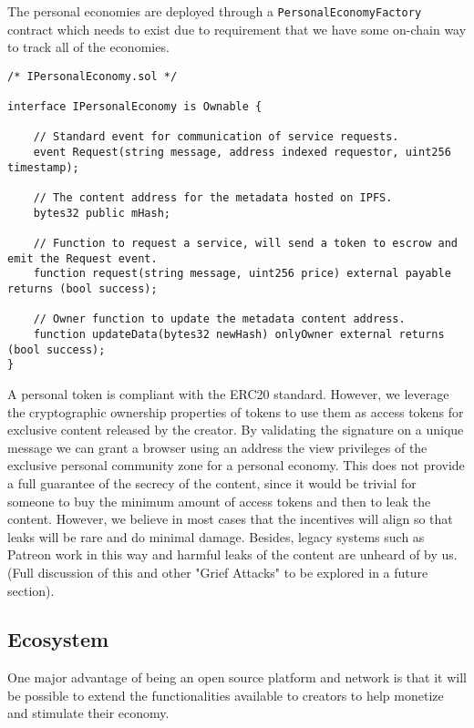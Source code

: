 \documentclass[a4paper, 10pt]{article}
\begin{document}
The personal economies are deployed through a \texttt{PersonalEconomyFactory} contract which needs to exist due to requirement that we have some on-chain way to track all of the economies.

\vfill

\begin{lstlisting}
/* IPersonalEconomy.sol */

interface IPersonalEconomy is Ownable {

	// Standard event for communication of service requests.
	event Request(string message, address indexed requestor, uint256 timestamp);
    
    // The content address for the metadata hosted on IPFS.
    bytes32 public mHash;
    
    // Function to request a service, will send a token to escrow and emit the Request event.
    function request(string message, uint256 price) external payable returns (bool success);
    
    // Owner function to update the metadata content address.
    function updateData(bytes32 newHash) onlyOwner external returns (bool success);
}
\end{lstlisting}

A personal token is compliant with the ERC20 standard. However, we leverage the cryptographic ownership properties of tokens to use them as access tokens for exclusive content released by the creator. By validating the signature on a unique message we can grant a browser using an address the view privileges of the exclusive personal community zone for a personal economy. This does not provide a full guarantee of the secrecy of the content, since it would be trivial for someone to buy the minimum amount of access tokens and then to leak the content. However, we believe in most cases that the incentives will align so that leaks will be rare and do minimal damage. Besides, legacy systems such as Patreon work in this way and harmful leaks of the content are unheard of by us. (Full discussion of this and other "Grief Attacks" to be explored in a future section).

\subsection{Ecosystem}

One major advantage of being an open source platform and network is that it will be possible to extend the functionalities available to creators to help monetize and stimulate their economy. 
\end{document}
